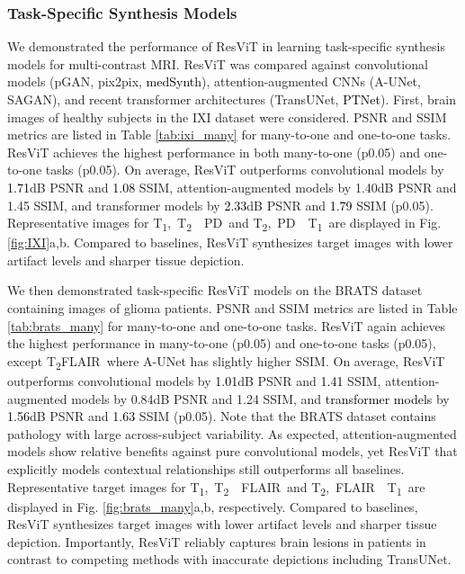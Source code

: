 \documentclass[journal,twoside,web]{ieeecolor}
\newcommand{\TtwoPDTone}{T\textsubscript{2},~PD~~T\textsubscript{1}}
\newcommand{\ToneTtwoPD}{T\textsubscript{1},~T\textsubscript{2}~~PD}
\newcommand{\TtwoFlair}{T\textsubscript{2}FLAIR}
\newcommand{\TtwoFlairTone}{T\textsubscript{2},~FLAIR~~T\textsubscript{1}}
\newcommand{\ToneTtwoFlair}{T\textsubscript{1},~T\textsubscript{2}~~FLAIR}
\newcommand*{\revhl}{\textcolor{black}}
\begin{document}
\subsubsection{Task-Specific Synthesis Models}
We demonstrated the performance of ResViT in learning task-specific synthesis models for multi-contrast MRI. ResViT was compared against convolutional models (pGAN, pix2pix, \revhl{medSynth}), attention-augmented CNNs (A-UNet, SAGAN), and recent transformer architectures (TransUNet, \revhl{PTNet}). First, brain images of healthy subjects in the IXI dataset were considered. PSNR and SSIM metrics are listed in Table \ref{tab:ixi_many} for many-to-one and one-to-one tasks. ResViT achieves the highest performance in both many-to-one  (p0.05) and one-to-one tasks (p0.05). On average, ResViT outperforms convolutional models by \revhl{1.71}dB PSNR and \revhl{1.08} SSIM, attention-augmented models by 1.40dB PSNR and 1.45 SSIM, and transformer models by \revhl{2.33}dB PSNR and \revhl{1.79} SSIM (p0.05). Representative images for \ToneTtwoPD~and \TtwoPDTone~are displayed in Fig. \ref{fig:IXI}a,b. Compared to baselines, ResViT synthesizes target images with lower artifact levels and sharper tissue depiction.

We then demonstrated task-specific ResViT models on the BRATS dataset containing images of glioma patients. PSNR and SSIM metrics are listed in Table \ref{tab:brats_many} for many-to-one and one-to-one tasks. ResViT again achieves the highest performance in many-to-one (p0.05) and one-to-one tasks (p0.05), except \TtwoFlair~where A-UNet has slightly higher SSIM. On average, ResViT outperforms convolutional models by \revhl{1.01}dB PSNR and \revhl{1.41} SSIM, attention-augmented models by 0.84dB PSNR and 1.24 SSIM, and \revhl{transformer models} by \revhl{1.56}dB PSNR and \revhl{1.63} SSIM (p0.05). Note that the BRATS dataset contains pathology with large across-subject variability. As expected, attention-augmented models show relative benefits against pure convolutional models, yet ResViT that explicitly models contextual relationships still outperforms all baselines. Representative target images for \ToneTtwoFlair~and \TtwoFlairTone~are displayed in Fig. \ref{fig:brats_many}a,b, respectively. Compared to baselines, ResViT synthesizes target images with lower artifact levels and sharper tissue depiction. Importantly, ResViT reliably captures brain lesions in patients in contrast to competing methods with inaccurate depictions including TransUNet.
\end{document}
